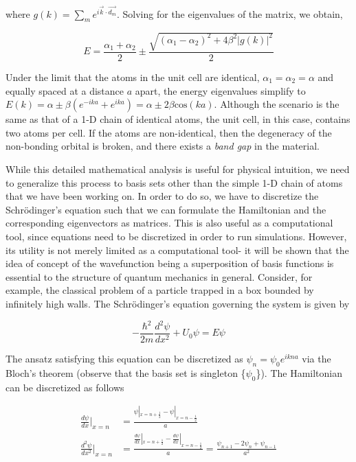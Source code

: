 \documentclass{resonance}
\begin{document}
where $g(k) = \sum_{m}e^{i\vec{k}\cdot \vec{d_{m}}}$. Solving for the eigenvalues of the matrix, we obtain, 

\begin{equation}
    E = \frac{\alpha_{1} + \alpha_{2}}{2} \pm \frac{\sqrt{(\alpha_{1} - \alpha_{2})^{2} + 4\beta^{2}|g(k)|^{2}}}{2}
\end{equation}

Under the limit that the atoms in the unit cell are identical, $\alpha_{1} = \alpha_{2} = \alpha$ and equally spaced at a distance $a$ apart, the energy eigenvalues simplify to $E(k) = \alpha \pm \beta (e^{-ika}+e^{ika}) = \alpha \pm 2\beta \text{cos}(ka)$. Although the scenario is the same as that of a 1-D chain of identical atoms, the unit cell, in this case, contains two atoms per cell. 
If the atoms are non-identical, then the degeneracy of the non-bonding orbital is broken, and there exists a \textit{band gap} in the material. \par

While this detailed mathematical analysis is useful for physical intuition, we need to generalize this process to basis sets other than the simple 1-D chain of atoms that we have been working on. In order to do so, we have to discretize the Schrödinger's equation such that we can formulate the Hamiltonian and the corresponding eigenvectors as matrices. This is also useful as a computational tool, since equations need to be discretized in order to run simulations. However, its utility is not merely limited as a computational tool- it will be shown that the idea of concept of the wavefunction being a superposition of basis functions is essential to the structure of quantum mechanics in general. Consider, for example, the classical problem of a particle trapped in a box bounded by infinitely high walls. The Schrödinger's equation governing the system is given by 

\begin{equation}
    -\frac{\hbar^2}{2m}\frac{d^2 \psi}{dx^2} + U_0 \psi = E \psi
\end{equation}

The ansatz satisfying this equation can be discretized as $\psi_{n} = \psi_{0}e^{ikna}$ via the Bloch's theorem (observe that the basis set is singleton \{$\psi_0$\}). The Hamiltonian can be discretized as follows

\begin{equation}
\begin{aligned}
    \frac{d\psi}{dx}|_{x=n} &= \frac{\psi|_{x=n+\frac{1}{2}}-\psi|_{x=n-\frac{1}{2}}}{a} \\
    \frac{d^2 \psi}{dx^2}|_{x=n} &= \frac{\frac{d\psi}{dx}|_{x=n+\frac{1}{2}}-\frac{d\psi}{dx}|_{x=n-\frac{1}{2}}}{a} = \frac{\psi_{n+1}-2\psi_{n}+\psi_{n-1}}{a^2}
\end{aligned}
\end{equation}
\end{document}
